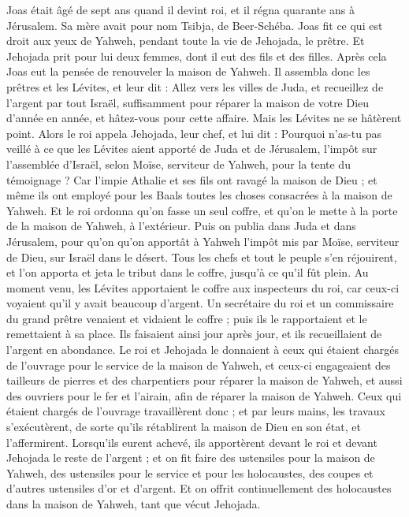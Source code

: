\begin{multicols}{2}
\VerseOne{}Joas était âgé de sept ans quand il devint roi, et il régna quarante ans à Jérusalem. Sa mère avait pour nom Tsibja, de Beer-Schéba.
Joas fit ce qui est droit aux yeux de Yahweh, pendant toute la vie de Jehojada, le prêtre.
Et Jehojada prit pour lui deux femmes, dont il eut des fils et des filles.
Après cela Joas eut la pensée de renouveler la maison de Yahweh.
Il assembla donc les prêtres et les Lévites, et leur dit : Allez vers les villes de Juda, et recueillez de l'argent par tout Israël, suffisamment pour réparer la maison de votre Dieu d'année en année, et hâtez-vous pour cette affaire. Mais les Lévites ne se hâtèrent point.
Alors le roi appela Jehojada, leur chef, et lui dit : Pourquoi n'as-tu pas veillé à ce que les Lévites aient apporté de Juda et de Jérusalem, l'impôt sur l'assemblée d'Israël, selon Moïse, serviteur de Yahweh, pour la tente du témoignage ?
Car l'impie Athalie et ses fils ont ravagé la maison de Dieu ; et même ils ont employé pour les Baals toutes les choses consacrées à la maison de Yahweh.
Et le roi ordonna qu'on fasse un seul coffre, et qu'on le mette à la porte de la maison de Yahweh, à l'extérieur.
Puis on publia dans Juda et dans Jérusalem, pour qu'on qu'on apportât à Yahweh l'impôt mis par Moïse, serviteur de Dieu, sur Israël dans le désert.
Tous les chefs et tout le peuple s'en réjouirent, et l'on apporta et jeta le tribut dans le coffre, jusqu'à ce qu'il fût plein.
Au moment venu, les Lévites apportaient le coffre aux inspecteurs du roi, car ceux-ci voyaient qu'il y avait beaucoup d'argent. Un secrétaire du roi et un commissaire du grand prêtre venaient et vidaient le coffre ; puis ils le rapportaient et le remettaient à sa place. Ils faisaient ainsi jour après jour, et ils recueillaient de l'argent en abondance.
Le roi et Jehojada le donnaient à ceux qui étaient chargés de l'ouvrage pour le service de la maison de Yahweh, et ceux-ci engageaient des tailleurs de pierres et des charpentiers pour réparer la maison de Yahweh, et aussi des ouvriers pour le fer et l'airain, afin de réparer la maison de Yahweh.
Ceux qui étaient chargés de l'ouvrage travaillèrent donc ; et par leurs mains, les travaux s'exécutèrent, de sorte qu'ils rétablirent la maison de Dieu en son état, et l'affermirent.
Lorsqu'ils eurent achevé, ils apportèrent devant le roi et devant Jehojada le reste de l'argent ; et on fit faire des ustensiles pour la maison de Yahweh, des ustensiles pour le service et pour les holocaustes, des coupes et d'autres ustensiles d'or et d'argent. Et on offrit continuellement des holocaustes dans la maison de Yahweh, tant que vécut Jehojada.

\end{multicols}
